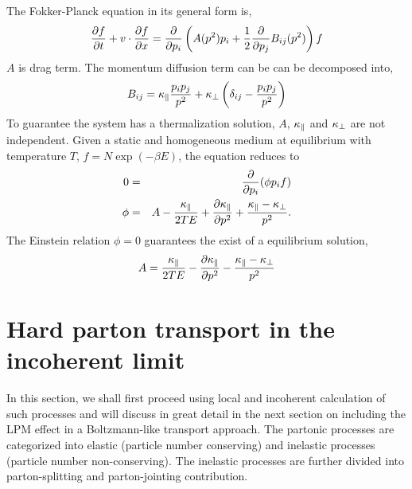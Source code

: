 The Fokker-Planck equation in its general form is,
\begin{eqnarray}
\frac{\partial f}{\partial t} + v\cdot\frac{\partial f}{\partial x}
= \frac{\partial}{\partial p_i} \left(A(p^2) p_i + \frac{1}{2}\frac{\partial}{\partial p_j} B_{ij}(p^2)\right)f 
\end{eqnarray}
$A$ is drag term. The momentum diffusion term can be can be decomposed into,
\begin{eqnarray}
B_{ij} = \kappa_{\|} \frac{p_i p_j}{p^2} + \kappa_{\perp} \left(\delta_{ij} - \frac{p_i p_j}{p^2}\right)
\end{eqnarray}
To guarantee the system has a thermalization solution, $A$, $\kappa_{\|}$ and $\kappa_{\perp}$ are not independent.
Given a static and homogeneous medium at equilibrium with temperature $T$, $f = N\exp\left(-\beta E\right)$, the equation reduces to
\begin{eqnarray}
0 &=& \frac{\partial}{\partial p_i}(\phi p_i f)\\
\phi &=& A - \frac{\kappa_{\|}}{2TE} + \frac{\partial \kappa_{\|}}{\partial p^2} + \frac{\kappa_{\|}-\kappa_{\perp}}{p^2}.
\end{eqnarray}
The Einstein relation $\phi = 0$ guarantees the exist of a equilibrium solution,
\begin{eqnarray}
A = \frac{\kappa_{\|}}{2TE} - \frac{\partial \kappa_{\|}}{\partial p^2} - \frac{\kappa_{\|}-\kappa_{\perp}}{p^2}
\end{eqnarray}

\section{Hard parton transport in the incoherent limit}
In this section, we shall first proceed using local and incoherent calculation of such processes and will discuss in great detail in the next section on including the LPM effect in a Boltzmann-like transport approach.
The partonic processes are categorized into elastic (particle number conserving) and inelastic processes (particle number non-conserving). 
The inelastic processes are further divided into parton-splitting and parton-jointing contribution. 

